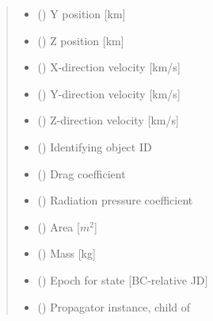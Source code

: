 \documentclass[letterpaper,10pt,english]{sphinxmanual}
\begin{document}
\begin{fulllineitems}
\begin{quote}
\begin{description}
\begin{itemize}
\item {} 
 () \textendash{} Y position {[}km{]}

\item {} 
 () \textendash{} Z position {[}km{]}

\item {} 
 () \textendash{} X-direction velocity {[}km/s{]}

\item {} 
 () \textendash{} Y-direction velocity {[}km/s{]}

\item {} 
 () \textendash{} Z-direction velocity {[}km/s{]}

\item {} 
 () \textendash{} Identifying object ID

\item {} 
 () \textendash{} Drag coefficient

\item {} 
 () \textendash{} Radiation pressure coefficient

\item {} 
 () \textendash{} Area {[}\(m^2\){]}

\item {} 
 () \textendash{} Mass {[}kg{]}

\item {} 
 () \textendash{} Epoch for state {[}BC-relative JD{]}

\item {} 
 () \textendash{} Propagator instance, child of 


\end{itemize}
\end{description}
\end{quote}
\end{fulllineitems}
\end{document}

